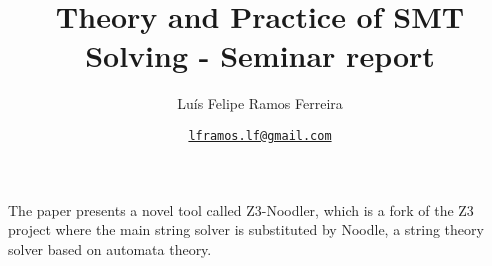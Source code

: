\documentclass{article}
\title{Theory and Practice of SMT Solving - Seminar report}
\author{Luís Felipe Ramos Ferreira}
\date{\href{mailto:lframos.lf@gmail.com}{\texttt{lframos.lf@gmail.com}}
}
\begin{document}
\maketitle

The paper presents a novel tool called Z3-Noodler, which is a fork of the Z3 project where the main string solver is substituted by
Noodle, a string theory solver based on automata theory.
\end{document}
